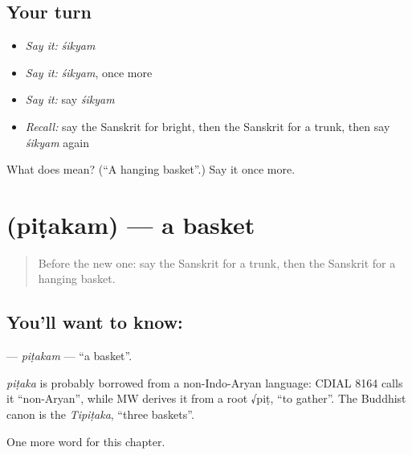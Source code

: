 \subsection*{Your turn}
\begin{itemize}
\raggedright
  \item \emph{Say it:} \emph{śikyam}
  \item \emph{Say it:} \emph{śikyam}, once more
  \item \emph{Say it:} say \emph{śikyam}
  \item \emph{Recall:} say the Sanskrit for bright, then the Sanskrit for a trunk, then say \emph{śikyam} again
\end{itemize}

\begin{tcolorbox}[breakable,colback=teal!4,colframe=teal!35!black,title={Before you move on}]
What does  mean? (\textquotedblleft{}A hanging basket\textquotedblright{}.) Say it once more.
\end{tcolorbox}
\section[\texorpdfstring{\sk{पिटकम्} (piṭakam)}{पिटकम् (piṭakam)}]{ (piṭakam) — a basket}

\label{lesson:SA-C189-pitakam}



\begin{quote}
Before the new one: say the Sanskrit for a trunk, then the Sanskrit for a hanging basket.
\end{quote}

\subsection*{You'll want to know: }
\textbf{} — \emph{piṭakam} — \textquotedblleft{}a basket\textquotedblright{}.

\begin{cousinweb}
\emph{piṭaka} is probably borrowed from a non-Indo-Aryan language: CDIAL 8164 calls it \textquotedblleft{}non-Aryan\textquotedblright{}, while MW derives it from a root √piṭ, \textquotedblleft{}to gather\textquotedblright{}. The Buddhist canon is the \emph{Tipiṭaka}, \textquotedblleft{}three baskets\textquotedblright{}.
\end{cousinweb}

\begin{grammarlens}[title={What you've built}]
One more word for this chapter.
\end{grammarlens}

